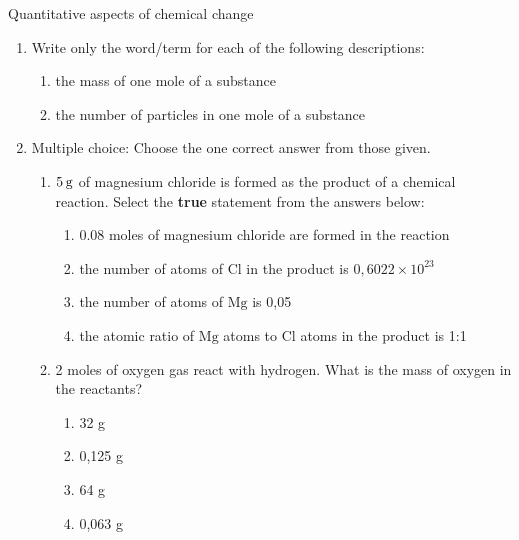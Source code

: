             \begin{eocexercises}{Quantitative aspects of chemical change}
            \nopagebreak
      \label{m38712*id286171}\begin{enumerate}[noitemsep, label=\textbf{\arabic*}. ] 
            \label{m38712*uid123}\item Write only the word/term for each of the following descriptions:
\label{m38712*id286187}\begin{enumerate}[noitemsep, label=\textbf{\alph*}. ] 
            \label{m38712*uid124}\item the mass of one mole of a substance
\label{m38712*uid125}\item the number of particles in one mole of a substance
\end{enumerate}
                \label{m38712*uid126}\item Multiple choice: Choose the one correct answer from those given.
\label{m38712*id286228}\begin{enumerate}[noitemsep, label=\textbf{\alph*}. ] 
            \label{m38712*uid127}\item $5\phantom{\rule{2pt}{0ex}}\mathrm{g}$ of magnesium chloride is formed as the product of a chemical reaction. Select the \textbf{true} statement from the answers below:
\label{m38712*id286251}\begin{enumerate}[noitemsep, label=\textbf{\alph*}. ] 
            \label{m38712*uid128}\item 0.08 moles of magnesium chloride are formed in the reaction
\label{m38712*uid129}\item the number of atoms of $\mathrm{Cl}$ in the product is $0,6022\ensuremath{\times}{10}^{23}$\label{m38712*uid130}\item the number of atoms of $\mathrm{Mg}$ is 0,05
\label{m38712*uid131}\item the atomic ratio of $\mathrm{Mg}$ atoms to $\mathrm{Cl}$ atoms in the product is 1:1
\end{enumerate}
                \label{m38712*uid132}\item 2 moles of oxygen gas react with hydrogen. What is the mass of oxygen in the reactants?
\label{m38712*id286339}\begin{enumerate}[noitemsep, label=\textbf{\alph*}. ] 
            \label{m38712*uid133}\item 32 g
\label{m38712*uid134}\item 0,125 g
\label{m38712*uid135}\item 64 g
\label{m38712*uid136}\item 0,063 g

\end{enumerate}
\end{enumerate}
\end{enumerate}
\end{eocexercises}

